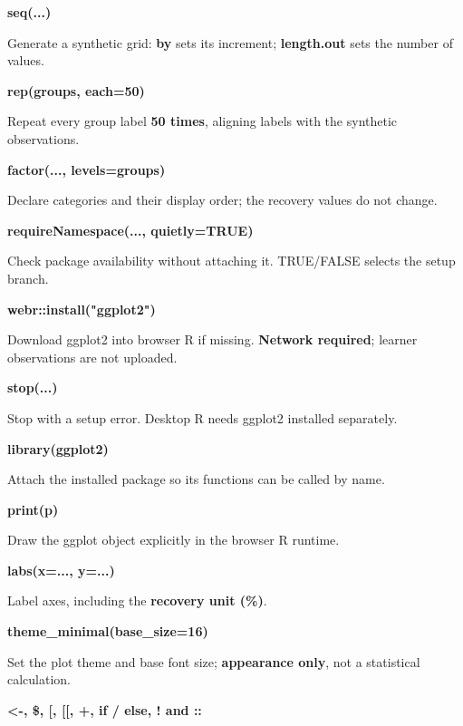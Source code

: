 \documentclass[11pt,a4paper]{article}
\begin{document}
\par\noindent\textbf{seq(...)}

Generate a synthetic grid: \textbf{by} sets its increment; \textbf{length.out} sets the number of values.

\par\noindent\textbf{rep(groups, each=50)}

Repeat every group label \textbf{50 times}, aligning labels with the synthetic observations.

\par\noindent\textbf{factor(..., levels=groups)}

Declare categories and their display order; the recovery values do not change.

\par\noindent\textbf{requireNamespace(..., quietly=TRUE)}

Check package availability without attaching it. TRUE/FALSE selects the setup branch.

\par\noindent\textbf{webr::install("ggplot2")}

Download ggplot2 into browser R if missing. \textbf{Network required}; learner observations are not uploaded.

\par\noindent\textbf{stop(...)}

Stop with a setup error. Desktop R needs ggplot2 installed separately.

\par\noindent\textbf{library(ggplot2)}

Attach the installed package so its functions can be called by name.

\par\noindent\textbf{print(p)}

Draw the ggplot object explicitly in the browser R runtime.

\par\noindent\textbf{labs(x=..., y=...)}

Label axes, including the \textbf{recovery unit (\%)}.

\par\noindent\textbf{theme\_minimal(base\_size=16)}

Set the plot theme and base font size; \textbf{appearance only}, not a statistical calculation.

\par\noindent\textbf{<-, \$, [, [[, +, if / else, ! and ::}
\end{document}
